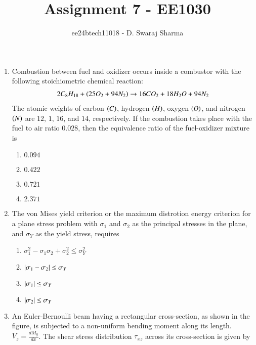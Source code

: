\documentclass[journal]{IEEEtran}
\begin{document}

\vspace{3cm}

\title{Assignment 7 - EE1030}
\author{ee24btech11018 - D. Swaraj Sharma}

{\let\newpage\relax\maketitle}
\renewcommand{\thefigure}{\theenumi}
\renewcommand{\thetable}{\theenumi}
\setlength{\intextsep}{10pt}
\renewcommand{\thetable}{\theenumi}
\begin{enumerate}
	\item Combustion between fuel  and oxidizer  occurs inside a combustor with the following stoichiometric chemical reaction:
		\begin{align*}
			2C_8H_{18}+\left(25O_2+94N_2\right)\to16CO_2+18H_2O+94N_2
		\end{align*}
		The atomic weights of carbon $\left(C\right)$, hydrogen $\left(H\right)$, oxygen $\left(O\right)$, and nitrogen $\left(N\right)$ are $12$, $1$, $16$, and $14$, respectively. If the combustion takes place with the fuel to air ratio $0.028$, then the equivalence ratio of the fuel-oxidizer mixture is
		\begin{enumerate}
			\item $0.094$
			\item $0.422$
			\item $0.721$
			\item $2.371$
		\end{enumerate}
	\item The von Mises yield criterion or the maximum distrotion energy criterion for a plane stress problem with $\sigma_1$ and $\sigma_2$ as the principal stresses in the plane, and $\sigma_Y$ as the yield stress, requires
		\begin{enumerate}
			\item $\sigma_1^2-\sigma_1\sigma_2+\sigma_2^2\leq\sigma_Y^2$
			\item $\left\vert\sigma_1-\sigma_2\right\vert \leq \sigma_Y$
			\item $\left\vert\sigma_1\right\vert\leq\sigma_Y$
			\item $\left\vert\sigma_2\right\vert\leq\sigma_Y$
		\end{enumerate}
	\item An Euler-Bernoulli beam having a rectangular cross-section, as shown in the figure, is subjected to a non-uniform bending moment along its length. $V_z = \frac{dM_y}{dx}$. The shear stress distribution $\tau_{xz}$ across its cross-section is given by 

\end{enumerate}
\end{document}
